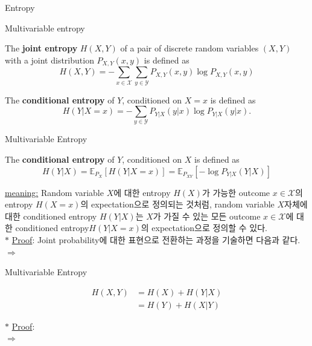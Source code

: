 \documentclass[9pt]{beamer}
\begin{document}
\begin{section}{Entropy}
        \begin{frame}{Multivariable entropy}
            \begin{definition}
                The \textbf{joint entropy} $H(X, Y)$ of a pair of discrete random variables $(X, Y)$ with a joint distribution $P_{X, Y}(x,y)$ is defined as 
                $$ H(X, Y) = -\sum_{x \in \mathcal X} \sum_{y \in \mathcal Y} P_{X, Y}(x,y) \log P_{X,Y}(x,y)$$
            \end{definition}            
            \begin{definition}
                The \textbf{conditional entropy} of $Y$, conditioned on $X=x$ is defined as
                $$ H(Y | X=x) = -\sum_{y \in \mathcal{Y}} {P_{Y | X}(y | x)} \log P_{Y| X}(y | x). $$
            \end{definition}
        \end{frame}

        \begin{frame}{Multivariable Entropy}
            \begin{definition}
                The \textbf{conditional entropy} of $Y$, conditioned on $X$ is defined as
                $$ H(Y | X) = \mathbb E_{P_X}[H(Y|X=x)] = \mathbb E_{P_{XY}}[-\log P_{Y|X} (Y|X)] $$
            \end{definition}
            \vspace{0.2cm}
            \checkmark \underline {meaning:} Random variable $X$에 대한 entropy $H(X)$가 가능한 outcome $x \in \mathcal X$의 entropy $H(X=x)$의 \alert{expectation}으로 정의되는 것처럼, random variable $X$자체에 대한 conditioned entropy $H(Y|X)$는 $X$가 가질 수 있는 모든 outcome $x \in \mathcal X$에 대한 \alert{conditioned entropy$H(Y|X=x)$의 expectation}으로 정의할 수 있다. \\
            \vspace{0.4cm}
            $\ast$ \underline{Proof}:
            Joint probability에 대한 표현으로 전환하는 과정을 기술하면 다음과 같다.
            \\$\Rightarrow$
            \vspace{2cm}
            
        \end{frame}

        \begin{frame}{Multivariable Entropy}
            \begin{theorem}
                \vspace{-0.4cm}
                \begin{align*} H(X,Y)& =H(X)+H(Y | X)  \\ &=H(Y) + H(X|Y) \end{align*}
            \end{theorem}
            \vspace{0.4cm}
            $\ast$ \underline{Proof}:
            \\$\Rightarrow$
            \vspace{3cm}
        \end{frame}


\end{section}
\end{document}
